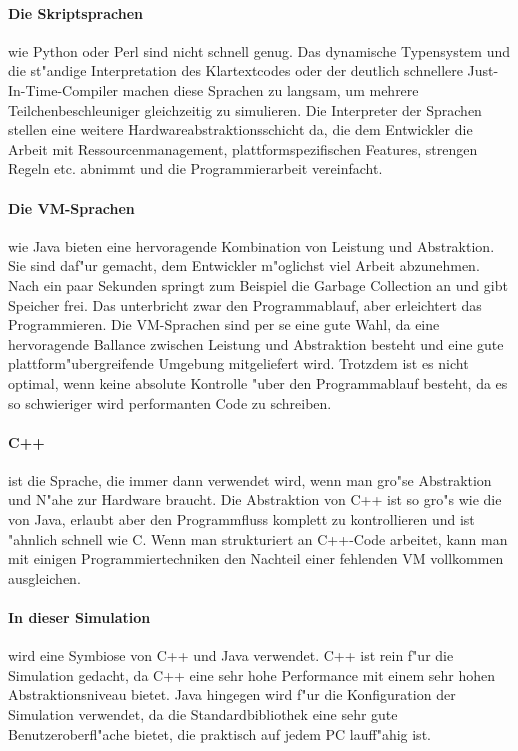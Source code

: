 \documentclass[14pt, a4paper]{report}
\begin{document}
\paragraph{Die Skriptsprachen} wie Python oder Perl sind nicht schnell genug.
Das dynamische Typensystem und die st"andige Interpretation des Klartextcodes oder 
der deutlich schnellere Just-In-Time-Compiler machen 
diese Sprachen zu langsam, um mehrere Teilchenbeschleuniger gleichzeitig zu 
simulieren. Die Interpreter der Sprachen stellen eine weitere Hardwareabstraktionsschicht
da, die dem Entwickler die Arbeit mit Ressourcenmanagement, plattformspezifischen Features,
strengen Regeln etc. abnimmt und die Programmierarbeit vereinfacht.

\paragraph{Die VM-Sprachen} wie Java bieten eine hervoragende Kombination von 
Leistung und Abstraktion. Sie sind daf"ur gemacht, dem Entwickler m"oglichst viel Arbeit
abzunehmen. Nach ein paar Sekunden springt zum Beispiel die Garbage Collection an und
gibt Speicher frei. Das unterbricht zwar den Programmablauf, aber erleichtert das Programmieren. 
Die VM-Sprachen sind per se eine gute Wahl, da eine hervoragende Ballance zwischen Leistung und Abstraktion 
besteht und eine gute plattform"ubergreifende Umgebung mitgeliefert wird. 
Trotzdem ist es nicht optimal, wenn keine absolute  Kontrolle "uber den Programmablauf besteht, da es so
schwieriger wird performanten Code zu schreiben.

\paragraph{C++} ist die Sprache, die immer dann verwendet wird, wenn man gro"se 
Abstraktion und N"ahe zur Hardware braucht. Die Abstraktion von C++ ist so gro"s wie die
von Java, erlaubt aber den Programmfluss komplett zu kontrollieren
und ist "ahnlich schnell
wie C. Wenn man strukturiert an C++-Code arbeitet, kann man mit einigen 
Programmiertechniken  
den Nachteil einer fehlenden VM vollkommen ausgleichen.

\paragraph{In dieser Simulation} wird eine Symbiose von C++ und Java verwendet. C++ ist rein f"ur 
die Simulation gedacht, da C++ eine sehr hohe Performance mit einem sehr hohen 
Abstraktionsniveau bietet. Java hingegen wird f"ur die Konfiguration der 
Simulation verwendet, da die
Standardbibliothek eine sehr gute Benutzeroberfl"ache bietet, die praktisch auf jedem
PC lauff"ahig ist.
\end{document}
